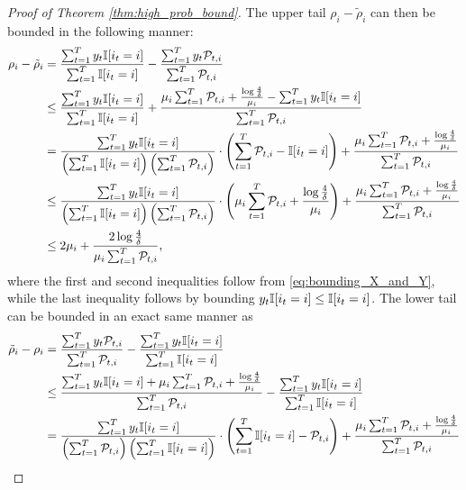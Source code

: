 \begin{proof}[Proof of Theorem \ref{thm:high_prob_bound}]
    The upper tail $\rho_{i} - \tilde{\rho}_{i}$ can then be bounded in the following manner: \begin{align*}
    \rho_{i} - \tilde{\rho}_{i} &= \frac{\sum_{t = 1} ^ {T} y_{t} \mathbb{I}{\left[i_{t} = i\right]}}{\sum_{t = 1} ^ {T} \mathbb{I}{\left[i_{t} = i\right]}} - \frac{\sum_{t = 1} ^ {T} y_{t} \mathcal{P}_{t, i}}{\sum_{t = 1} ^ {T} \mathcal{P}_{t, i}} \\
    &\le \frac{\sum_{t = 1} ^ {T} y_{t} \mathbb{I}{\left[i_{t} = i\right]}}{\sum_{t = 1} ^ {T} \mathbb{I}{\left[i_{t} = i\right]}} + \frac{\mu_{i} \sum_{t = 1} ^ {T} \mathcal{P}_{t, i} + \frac{\log \frac{4}{\delta}}{\mu_{i}} -  \sum_{t = 1} ^ {T} y_{t}\mathbb{I}{\left[i_{t} = i\right]}}{\sum_{t = 1} ^ {T} \mathcal{P}_{t, i}} \\
    &= \frac{\sum_{t = 1} ^ {T} y_{t} \mathbb{I}{\left[i_{t} = i\right]}}{\left( \sum_{t = 1} ^ {T} \mathbb{I}{\left[i_{t} = i\right]} \right) \left( \sum_{t = 1} ^ {T} \mathcal{P}_{t, i} \right)} \cdot \left( \sum_{t = 1} ^ {T} \mathcal{P}_{t, i} - \mathbb{I}{\left[i_{t} = i\right]} \right) + \frac{\mu_{i} \sum_{t = 1} ^ {T} \mathcal{P}_{t, i} + \frac{\log \frac{4}{\delta}}{\mu_{i}}}{\sum_{t = 1} ^ {T} \mathcal{P}_{t, i}} \\
    &\le \frac{\sum_{t = 1} ^ {T} y_{t} \mathbb{I}{\left[i_{t} = i\right]}}{\left( \sum_{t = 1} ^ {T} \mathbb{I}{\left[i_{t} = i\right]} \right) \left( \sum_{t = 1} ^ {T} \mathcal{P}_{t, i} \right)} \cdot \left( \mu_{i} \sum_{t = 1} ^ {T} \mathcal{P}_{t, i} + \frac{\log \frac{4}{\delta}}{\mu_{i}} \right) + \frac{\mu_{i} \sum_{t = 1} ^ {T} \mathcal{P}_{t, i} + \frac{\log \frac{4}{\delta}}{\mu_{i}}}{\sum_{t = 1} ^ {T} \mathcal{P}_{t, i}} \\
    &\le 2\mu_{i} + \frac{2\log \frac{4}{\delta}}{\mu_{i} \sum_{t = 1} ^ {T} \mathcal{P}_{t, i}}, 
\end{align*} 
where the first and second inequalities follow from \eqref{eq:bounding_X_and_Y}, while the last inequality follows by bounding $y_{t} \mathbb{I}{\left[i_{t} = i\right]} \le \mathbb{I}{\left[i_{t} = i\right]}$. The lower tail can be bounded in an exact same manner as \begin{align*}
    \tilde{\rho}_{i} - \rho_{i} &= \frac{\sum_{t = 1} ^ {T} y_{t} \cP_{t, i}}{\sum_{t = 1} ^ {T} \cP_{t, i}} - \frac{\sum_{t = 1} ^ {T} y_{t} \ind{i_{t} = i}}{\sum_{t = 1} ^ {T} \ind{i_{t} = i}} \\
    &\le \frac{\sum_{t = 1} ^ {T} y_{t}\ind{i_{t} = i} + \mu_{i} \sum_{t = 1} ^ {T} \cP_{t, i} + \frac{\log \frac{4}{\delta}}{\mu_{i}}}{\sum_{t = 1} ^ {T} \cP_{t, i}} - \frac{\sum_{t = 1} ^ {T} y_{t} \ind{i_{t} = i}}{\sum_{t = 1} ^ {T} \ind{i_{t} = i}} \\
    &= \frac{\sum_{t = 1} ^ {T} y_{t} \ind{i_{t} = i}}{\bigc{\sum_{t = 1} ^ {T} \cP_{t, i}} \bigc{\sum_{t = 1} ^ {T} \ind{i_{t} = i}}} \cdot \bigc{\sum_{t = 1} ^ {T} \ind{i_{t} = i} - \cP_{t, i}} + \frac{\mu_{i} \sum_{t = 1} ^ {T} \cP_{t, i} + \frac{\log \frac{4}{\delta}}{\mu_{i}}}{\sum_{t = 1} ^ {T} \cP_{t, i}} \\

\end{align*}
\end{proof}
